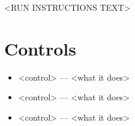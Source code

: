 
<RUN INSTRUCTIONS TEXT>

\section{Controls}
\label{app:controls}


\begin{itemize}
  \item <control> --- <what it does>
  \item <control> --- <what it does>
  \item <control> --- <what it does>
\end{itemize}
